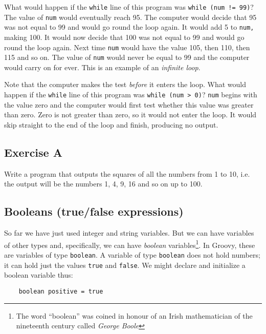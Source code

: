 What would happen if the \texttt{while} line of this program was
\texttt{while (num != 99)}?
The value of \texttt{num} would eventually reach 95.  The computer would
decide that 95 was not equal to 99 and would go round the loop again.
It would add 5 to \texttt{num,} making 100.
It would now decide that 100 was not equal to 99 and would go round the
loop again.  Next time \texttt{num} would have the value 105, then 110,
then 115 and so on.  The value of \texttt{num} would never be equal to 99
and the computer would carry on for ever.  This is an example of
an \emph{infinite loop}.

Note that the computer makes the test \emph{before} it enters the loop.
What would happen if the \texttt{while} line of this program was
\texttt{while (num > 0)}?   \texttt{num} begins with the value zero and the computer would first
test whether this value was greater than zero.  Zero is not greater than
zero, so it would not enter the loop.  It would skip straight to the end
of the loop and finish, producing no output.


\subsection*{Exercise A}

Write a program that outputs the squares of all the numbers from 1 to
10, i.e. the output will be the numbers 1, 4, 9, 16 and so on up to 100.

\subsection{Booleans (true/false expressions)}

So far we have just used integer and string variables.  But we can
have variables of other types and, specifically, we can have
\emph{boolean} variables\footnote{The word ``boolean'' was coined in honour of an
Irish mathematician of the nineteenth century called \emph{George Boole}}.  
In Groovy, these are variables of type \texttt{boolean}.
A variable of type \texttt{boolean} does not hold numbers;
it can hold just the values \texttt{true} and \texttt{false}.  We
might declare and initialize a boolean variable thus:

\begin{Verbatim}
    boolean positive = true
\end{Verbatim}

